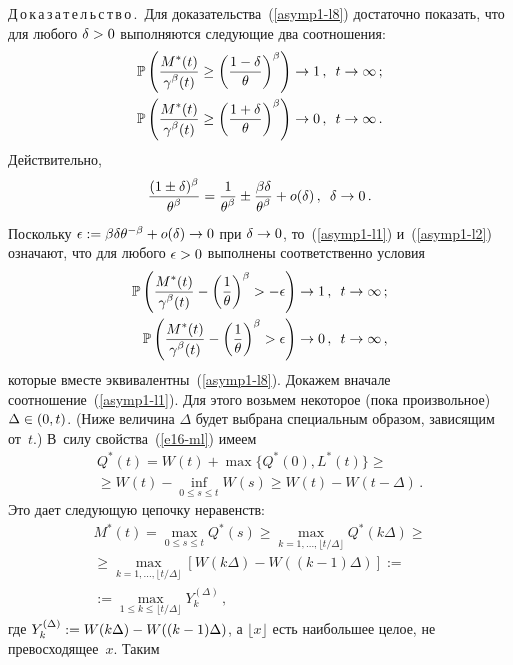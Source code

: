 \begin{multicols}{2}
\noindent
Д\,о\,к\,а\,з\,а\,т\,е\,л\,ь\,с\,т\,в\,о\,.\
Для доказательства~(\ref{asymp1-l8}) достаточно показать, что для
любого $\delta\hm>0$ выполняются следующие два соотношения:
\begin{align}
\mathbb{P} \left( \displaystyle\frac{\displaystyle M^*(t)\mathstrut}{\displaystyle \gamma^\beta(t)\mathstrut} \geq \left(
\displaystyle\frac{\displaystyle 1-\delta\mathstrut}{\displaystyle \theta\mathstrut} \right)^\beta \right ) & \to 1\,,\enskip t \to
\infty \,; \label{asymp1-l1}\\
\mathbb{P} \left( \displaystyle\frac{\displaystyle M^*(t)\mathstrut}{\displaystyle \gamma^\beta(t)\mathstrut} \geq \left(
\displaystyle\frac{\displaystyle 1+\delta\mathstrut}{\displaystyle \theta\mathstrut} \right)^\beta \right) &\to 0\,,\enskip t \to
\infty\,. \label{asymp1-l2}
\end{align}
Действительно,
$$
\displaystyle\frac{\displaystyle (1\pm \delta)^\beta\mathstrut}{\displaystyle {\theta}^\beta\mathstrut}=\displaystyle\frac{\displaystyle 1\mathstrut}{\displaystyle {\theta}^\beta\mathstrut}\pm
\displaystyle\frac{\displaystyle \beta \delta\mathstrut}{\displaystyle {\theta}^\beta\mathstrut}+o(\delta)\,,\enskip  \delta \to 0\,.
$$
Поскольку $\epsilon :=\beta \delta\theta^{-\beta}\hm+o(\delta)\hm\to 0$   
при  $\delta\hm\to 0$, то~(\ref{asymp1-l1}) и~(\ref{asymp1-l2})
означают, что для любого $\epsilon\hm>0$ выполнены соответственно условия
\begin{align*}
\mathbb{P} \left(\displaystyle\frac{\displaystyle M^*(t)\mathstrut}{\displaystyle \gamma^\beta(t)\mathstrut}-\left(
\displaystyle\frac{\displaystyle 1\mathstrut}{\displaystyle \theta\mathstrut}\right)^\beta > -\epsilon \right ) & \to 1\,,\enskip t \to \infty\,;\\
\mathbb{P} \left(\displaystyle\frac{\displaystyle M^*(t)\mathstrut}{\displaystyle \gamma^\beta(t)\mathstrut}-\left(
\displaystyle\frac{\displaystyle 1\mathstrut}{\displaystyle \theta\mathstrut}\right)^\beta > \epsilon \right ) &\to 0\,,\enskip t \to \infty\,,
\end{align*}
которые вместе эквивалентны~(\ref{asymp1-l8}). Докажем вначале
соотношение~(\ref{asymp1-l1}). Для этого возьмем некоторое (пока
произвольное) $\Delta \hm\in (0,t)$. (Ниже величина $\Delta$ будет
выбрана специальным образом, зависящим от~$t$.) В~силу свойства~(\ref{e16-ml}) имеем
\begin{multline}
Q^*(t)=W(t)+\max\{Q^*(0), L^*(t)\}\geq{}\\
{}\geq W(t) - \inf_{0 \leq s \leq t} W(s)\geq W(t)-W(t-\Delta)\,.
\label{e18a-ml}
\end{multline}
Это дает  следующую цепочку неравенств:
\begin{multline*}
M^*(t)= \max\limits_{0 \leq s \leq t} Q^*(s)
\geq \max\limits_{k=1,\ldots,\lfloor t/\Delta \rfloor} Q^*(k \Delta)\geq{}\\
{}\geq \max\limits_{k=1,\ldots,\lfloor t/\Delta \rfloor}
[W(k\Delta)-W((k-1)\Delta)]:={}\\
{}:=\max\limits_{1\leq k \leq \lfloor t/\Delta \rfloor}Y_k^{(\Delta)}\,,
\end{multline*}
где $Y_k^{(\Delta)}:=W(k\Delta)\hm-W((k-1)\Delta)$, а $\lfloor x
\rfloor$ есть  наибольшее целое, не превосходящее~$x$. Таким

\end{multicols}

